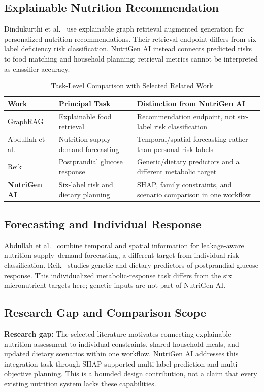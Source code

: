 \documentclass[conference]{IEEEtran}
\begin{document}
\subsection{Explainable Nutrition Recommendation}
Dindukurthi et al.~\cite{dindukurthi2026explainable} use explainable graph retrieval augmented generation for personalized nutrition recommendations. Their retrieval endpoint differs from six-label deficiency risk classification. NutriGen AI instead connects predicted risks to food matching and household planning; retrieval metrics cannot be interpreted as classifier accuracy.

\begin{table}[t]
\centering
\caption{Task-Level Comparison with Selected Related Work}
\label{tab:related_work}
\begin{tabular}{lll}
\toprule
\textbf{Work} & \textbf{Principal Task} & \textbf{Distinction from NutriGen AI} \\
\midrule
GraphRAG~\cite{dindukurthi2026explainable} & Explainable food retrieval & Recommendation endpoint, not six-label risk classification \\
Abdullah et al.~\cite{abdullah2026leakage} & Nutrition supply--demand forecasting & Temporal/spatial forecasting rather than personal risk labels \\
Reik~\cite{reik2023genetic} & Postprandial glucose response & Genetic/dietary predictors and a different metabolic target \\
\textbf{NutriGen AI} & Six-label risk and dietary planning & SHAP, family constraints, and scenario comparison in one workflow \\
\bottomrule
\end{tabular}
\end{table}

\subsection{Forecasting and Individual Response}
Abdullah et al.~\cite{abdullah2026leakage} combine temporal and spatial information for leakage-aware nutrition supply--demand forecasting, a different target from individual risk classification. Reik~\cite{reik2023genetic} studies genetic and dietary predictors of postprandial glucose response. This individualized metabolic-response task differs from the six micronutrient targets here; genetic inputs are not part of NutriGen AI.

\subsection{Research Gap and Comparison Scope}
\textbf{Research gap:} The selected literature motivates connecting explainable nutrition assessment to individual constraints, shared household meals, and updated dietary scenarios within one workflow. NutriGen AI addresses this integration task through SHAP-supported multi-label prediction and multi-objective planning. This is a bounded design contribution, not a claim that every existing nutrition system lacks these capabilities.
\end{document}
